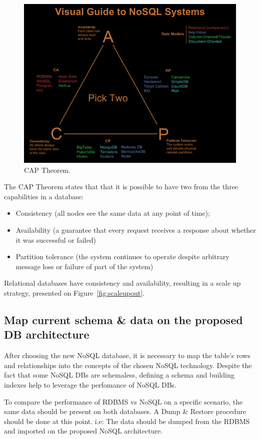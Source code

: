 \begin{figure}[ht!]
\centering
\includegraphics[width=120mm]{Imagens/cap.png}
\caption{CAP Theorem.\cite{captheorem}\label{fig:cap}}
\end{figure}

The CAP Theorem states that that it is possible to have two from the three capabilities in a database: 
\begin{itemize}
\item{Consistency (all nodes see the same data at any point of time);}
\item{Availability (a guarantee that every request receives a response about whether it was successful or failed)}
\item{Partition tolerance (the system continues to operate despite arbitrary message loss or failure of part of the system)
}
\end{itemize}

Relational databases have consistency and availability, resulting in a scale up strategy, presented on Figure~\ref{fig:scaleupout}.

\subsection{Map current schema \& data on the proposed DB architecture}
After choosing the new NoSQL database, it is necessary to map the table's rows and relationships into the concepts of the chosen NoSQL technology. Despite the fact that some NoSQL DBs are schemaless, defining a schema and building indexes help to leverage the perfomance of NoSQL DBs.

To compare the performance of RDBMS vs NoSQL on a specific scenario, the same data should be present on both databases. A Dump \& Restore procedure should be done at this point. i.e: The data should be dumped from the RDBMS and imported on the proposed NoSQL architecture.

